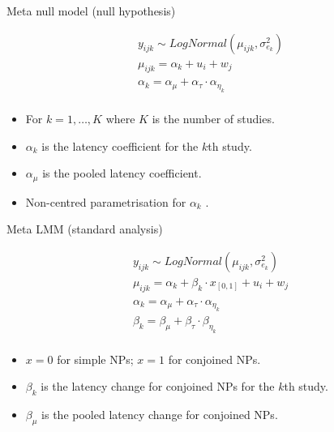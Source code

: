 \begin{frame}[fragile]{Meta null model (null hypothesis)}
	
		\begin{equation*}
			\begin{aligned}	
				y_{ijk} \sim LogNormal(\mu_{ijk}, \sigma_{e_k}^2) \\
				\mu_{ijk} = \alpha_k + u_i + w_j\\
				\alpha_k = \alpha_{\mu} + \alpha_{\tau} \cdot \alpha_{\eta_k}\\
			\end{aligned}
		\end{equation*}
		\begin{small}	
			\begin{itemize}
				\item For $k = 1, \dots, K$ where $K$ is the number of studies.
				\item $\alpha_k$ is the latency coefficient for the $k$th study.
				\item $\alpha_{\mu}$ is the pooled latency coefficient.
				\item Non-centred parametrisation for $\alpha_k$ \parencite{gelman2014}.
			\end{itemize}
		\end{small}
\end{frame}


\begin{frame}[fragile]{Meta LMM (standard analysis)}
			
	\begin{equation*}
		\begin{aligned}	
			y_{ijk} \sim LogNormal(\mu_{ijk}, \sigma_{e_k}^2)\\
			\mu_{ijk} = \alpha_k + \beta_k \cdot x_{[0,1]} + u_i + w_j\\
			\alpha_k = \alpha_{\mu} + \alpha_{\tau} \cdot \alpha_{\eta_k}\\
			\beta_k = \beta_{\mu} + \beta_{\tau} \cdot \beta_{\eta_k}\\
		\end{aligned}	
	\end{equation*}		
	\begin{small}	
		\begin{itemize}
			\item $x=0$ for simple NPs; $x=1$ for conjoined NPs.
			\item $\beta_k$ is the latency change for conjoined NPs for the $k$th study.
			\item $\beta_{\mu}$ is the pooled latency change for conjoined NPs.
		\end{itemize}
	\end{small}
	
\end{frame}


